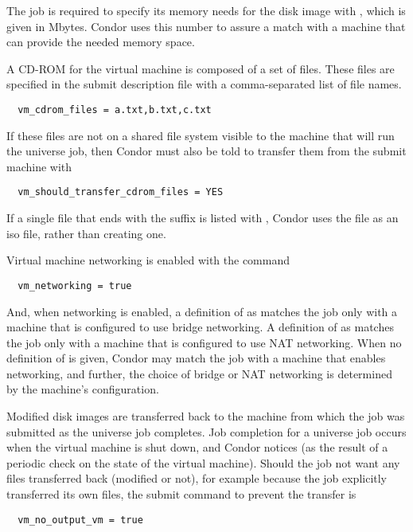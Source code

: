 The job is required to specify its memory needs 
for the disk image with ,
which is given in Mbytes.
Condor uses this number to assure a match with a machine
that can provide the needed memory space.

A CD-ROM for the virtual machine is composed of a set of files.
These files are specified in the submit description file
with a comma-separated list of file names.
\begin{verbatim}
  vm_cdrom_files = a.txt,b.txt,c.txt
\end{verbatim}
If these files are not on a shared file system visible to
the machine that will run the  universe job, then
Condor must also be told to transfer them from
the submit machine with 
\begin{verbatim}
  vm_should_transfer_cdrom_files = YES
\end{verbatim}
If a single file that ends with the suffix  is listed
with ,
Condor uses the file as an iso file, rather than creating one.

Virtual machine networking is enabled with the command
\begin{verbatim}
  vm_networking = true
\end{verbatim}
And, when networking is enabled, a definition of
 as 
matches the job only with a machine that is configured to use
bridge networking.
A definition of
 as 
matches the job only with a machine that is configured to use
NAT networking.
When no definition of
 is given,
Condor may
match the job with a machine that enables networking,
and further, the choice of bridge or NAT networking
is determined by the machine's configuration.

Modified disk images are transferred back to the machine from which
the job was submitted as the  universe job completes.
Job completion for a  universe job occurs when 
the virtual machine is shut down, and Condor notices 
(as the result of a periodic check on the state of the virtual machine).
Should the job not want any files transferred back (modified or not),
for example because the job explicitly transferred its own files,
the submit command to prevent the transfer is
\begin{verbatim}
  vm_no_output_vm = true
\end{verbatim}

